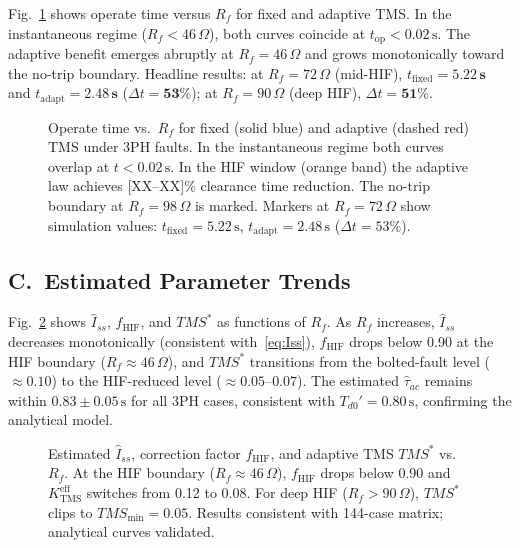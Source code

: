 \documentclass[10pt,journal,twoside]{IEEEtran}
\newcommand{\sss}{\,\text{s}}
\newcommand{\Rf}{R_{\!f}}
\newcommand{\tms}{TMS}
\newcommand{\tmss}{TMS^*}
\newcommand{\Iss}{\hat{I}_{ss}}
\newcommand{\tauac}{\hat{\tau}_{ac}}
\newcommand{\fhif}{f_{\mathrm{HIF}}}
\newcommand{\Keff}{K_{\mathrm{TMS}}^{\mathrm{eff}}}
\begin{document}
Fig.~\ref{fig:triptime} shows operate time versus $\Rf$ for fixed and
adaptive TMS.  In the instantaneous regime ($\Rf < 46\,\Omega$), both curves
coincide at $t_{\mathrm{op}} < 0.02\sss$.  The adaptive benefit emerges
abruptly at $\Rf = 46\,\Omega$ and grows monotonically toward the no-trip
boundary.  Headline results: at $\Rf = 72\,\Omega$ (mid-HIF),
$t_{\mathrm{fixed}} = \mathbf{5.22\sss}$ and
$t_{\mathrm{adapt}} = \mathbf{2.48\sss}$ ($\Delta t = \mathbf{53\%}$);
at $\Rf = 90\,\Omega$ (deep HIF), $\Delta t = \mathbf{51\%}$.

\begin{figure}[!t]
\centering

\caption{Operate time vs.\ $\Rf$ for fixed (solid blue) and adaptive
  (dashed red) TMS under 3PH faults.  In the instantaneous regime both
  curves overlap at $t < 0.02\sss$.  In the HIF window (orange band) the
  adaptive law achieves [XX--XX]\% clearance time reduction.  The no-trip
  boundary at $\Rf = 98\,\Omega$ is marked.
  Markers at $\Rf = 72\,\Omega$ show simulation values: $t_{\mathrm{fixed}}=5.22\sss$,
  $t_{\mathrm{adapt}}=2.48\sss$ ($\Delta t=53\%$).}
\label{fig:triptime}
\end{figure}

\subsection{C.\ Estimated Parameter Trends}
\label{sec:results:params}

Fig.~\ref{fig:est_params} shows $\Iss$, $\fhif$, and $\tmss$ as functions
of $\Rf$.  As $\Rf$ increases, $\Iss$ decreases monotonically (consistent
with~\eqref{eq:Iss}), $\fhif$ drops below 0.90 at the HIF boundary
($\Rf \approx 46\,\Omega$), and $\tmss$ transitions from the bolted-fault
level ($\approx 0.10$) to the HIF-reduced level ($\approx 0.05$--$0.07$).
The estimated $\tauac$ remains within $0.83 \pm 0.05\sss$ for all 3PH cases,
consistent with $T_{d0}' = 0.80\sss$, confirming the analytical model.

\begin{figure}[!t]
\centering

\caption{Estimated $\Iss$, correction factor $\fhif$, and adaptive TMS
  $\tmss$ vs.\ $\Rf$.  At the HIF boundary ($\Rf \approx 46\,\Omega$),
  $\fhif$ drops below 0.90 and $\Keff$ switches from 0.12 to 0.08.
  For deep HIF ($\Rf > 90\,\Omega$), $\tmss$ clips to $\tms_{\min} = 0.05$.
  Results consistent with 144-case matrix; analytical curves validated.}
\label{fig:est_params}
\end{figure}
\end{document}
